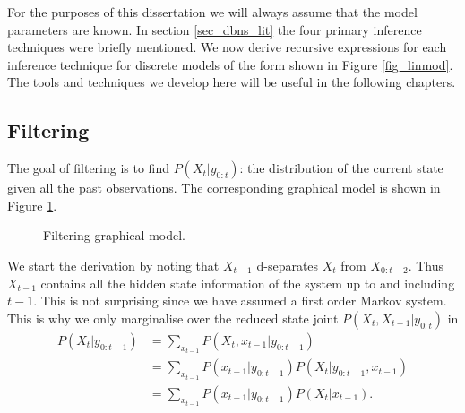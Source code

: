 For the purposes of this dissertation we will always assume that the model parameters are known. In section \ref{sec_dbns_lit} the four primary inference techniques were briefly mentioned. We now derive recursive expressions for each inference technique for discrete models of the form shown in Figure \ref{fig_linmod}. The tools and techniques we develop here will be useful in the following chapters. 

\subsection{Filtering}
The goal of filtering is to find $P(X_t|y_{0:t})$: the distribution of the current state given all the past observations. The corresponding graphical model is shown in Figure \ref{fig_linmod_filter_hmm}.
\begin{figure}[H] 
\centering
{}
\caption{Filtering graphical model.}
\label{fig_linmod_filter_hmm}
\end{figure}
We start the derivation by noting that $X_{t-1}$ d-separates $X_t$ from $X_{0:t-2}$. Thus $X_{t-1}$ contains all the hidden state information of the system up to and including $t-1$. This is not surprising since we have assumed a first order Markov system. This is why we only marginalise over the reduced state joint $P(X_t, X_{t-1}|y_{0:t})$ in
\begin{equation}
\begin{aligned}
P(X_t| y_{0:t-1}) &= \sum_{x_{t-1}} P(X_t, x_{t-1}| y_{0:t-1})\\
&= \sum_{x_{t-1}} P(x_{t-1}|y_{0:t-1})P(X_t|y_{0:t-1}, x_{t-1})\\  
& = \sum_{x_{t-1}} P(x_{t-1}|y_{0:t-1})P(X_t|x_{t-1}).
\end{aligned}
\label{eq_forward_no_recur}
\end{equation}
